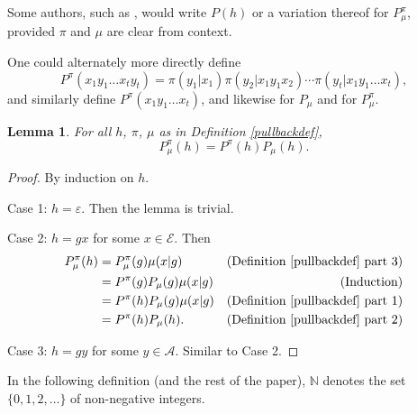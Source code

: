 \documentclass[twoside]{article}
\newtheorem{lemma}[theorem]{Lemma}
\begin{document}
Some authors, such as \cite{hutter2009discrete}, would write $P(h)$ or a variation thereof
for $P^\pi_\mu$, provided $\pi$ and $\mu$ are clear from context.

One could alternately more directly define
\[
    P^\pi(x_1y_1\ldots x_ty_t)
    = \pi(y_1|x_1)\pi(y_2|x_1y_1x_2)\cdots \pi(y_t|x_1y_1\ldots x_t),
\]
and similarly define $P^\pi(x_1y_1\ldots x_t)$,
and likewise for $P_\mu$ and for $P^\pi_\mu$.

\begin{lemma}
\label{factorizationlemma}
    For all $h$, $\pi$, $\mu$ as in Definition \ref{pullbackdef},
    \[
        P^\pi_\mu(h) = P^\pi(h)P_\mu(h).
    \]
\end{lemma}

\begin{proof}
    By induction on $h$.

    Case 1: $h=\varepsilon$. Then the lemma is trivial.

    Case 2: $h=gx$ for some $x\in\mathcal E$.
        Then
        \begin{align*}
            P^\pi_\mu(h)
                &= P^\pi_\mu(g)\mu(x|g)
                    &\mbox{(Definition \ref{pullbackdef} part 3)}\\
                &= P^\pi(g)P_\mu(g)\mu(x|g)
                    &\mbox{(Induction)}\\
                &= P^\pi(h)P_\mu(g)\mu(x|g)
                    &\mbox{(Definition \ref{pullbackdef} part 1)}\\
                &= P^\pi(h)P_\mu(h).
                    &\mbox{(Definition \ref{pullbackdef} part 2)}
        \end{align*}

    Case 3: $h=gy$ for some $y\in\mathcal A$.
        Similar to Case 2.
\end{proof}

In the following definition (and the rest of the paper),
$\mathbb N$ denotes the set $\{0,1,2,\ldots\}$ of non-negative
integers.
\end{document}
